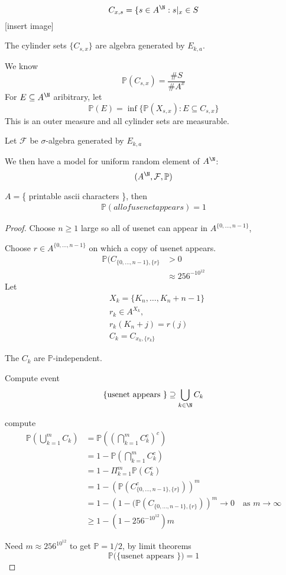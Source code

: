 \[
	C_{x,s} = \{ s \in A^{\N} : s |_{x} \in S
\] 
[insert image]

The cylinder sets $\{ C_{s,x} \}$ are algebra generated by $E_{k,a}$.

We know 
\[
	\mathbb{P}(C_{s,x} ) = \frac{\#S}{\# A^x}
\] 
For $E \subseteq A^{\N}$ aribitrary, let
 \[
	 \mathbb{P}(E) = \inf \{\mathbb{P}(X_{s,x}) : E \subseteq C_{s,x} \}
\] 
This is an outer measure and all cylinder sets are measurable.

Let $\mathcal{F}$ be $\sigma$-algebra generated by $E_{k,a}$
 
We then have a model for uniform random element of $A^{\N}$:
\[
	(A^{\N}, \mathcal{F}, \mathbb{P})
\] 

\begin{example}

	$A = $\{ printable ascii characters \}, then
	\begin{align*}
		\mathbb{P}(all of usenet appears ) = 1
	\end{align*} 
\end{example}

\begin{proof}
	Choose $n \geq 1$ large so all of usenet can appear in $A ^{\{0,\ldots,n-1\}}$,

	Choose  $r \in A^{\{0,\ldots,n-1\}} $ on which a copy of usenet appears.
	\begin{align*}
		\mathbb{P}(C_{\{0,\ldots, n-1\}, \{r\}} &> 0 \\
												&\approx 256^{-10^{12}}
	\end{align*}
	Let
	\begin{align*}
		&X_k = \{ K_n, \ldots, K_n + n-1 \} \\
		&r_k \in A^{X_k}, \\
		&r_k(K_n + j) = r(j) \\
		&C_k = C_{x_k, \{r_k\}}
	\end{align*}
	
	The $C_k$ are $\mathbb{P}$-independent.

	Compute event 
	\[
		\{\text{usenet appears \}} \contains \bigcup_{k \in \N} C_k
	\] 
	 
	compute
	\begin{align*}
		\mathbb{P}( \bigcup_{k=1}^{m} C_k ) &= \mathbb{P}((\bigcap_{k=1}^{m} C_{k}^c )^c) \\
											&= 1 - \mathbb{P} ( \bigcap_{k=1}^{m} C_{k}^c ) \\
											&= 1 - \Pi_{k=1}^{m} \mathbb{P}(C_k^c) \\
											&= 1 - \left(\mathbb{P}(C^c_{\{0, \ldots, n-1\}, \{r\}})\right)^m \\
											&= 1 - \left(1 - (\mathbb{P}(C_{\{0, \ldots, n-1\}, \{r\}})\right)^m \to 0 \quad \text{as } m\to \infty \\
											&\geq 1 - (1 - 256^{-10^12})m
	\end{align*} 

	Need $m \approx 256^{10^{12}}$ to get $\mathbb{P} = 1/2$, by limit theorems
	\[
		\mathbb{P}(\{\text{usenet appears \})} = 1
	\] 
\end{proof}


